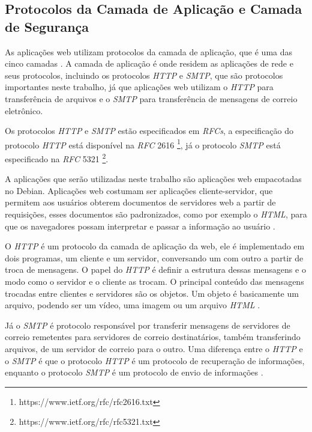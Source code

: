 \subsection{Protocolos da Camada de Aplicação e Camada de Segurança}

As aplicações web utilizam protocolos da camada de aplicação, que é uma das
cinco camadas \cite{kurose2010redes}. A camada de aplicação é onde residem as 
aplicações de rede e seus protocolos, incluindo os protocolos \textit{HTTP} e 
\textit{SMTP}, que são protocolos importantes neste trabalho, já que 
aplicações web utilizam o \textit{HTTP} para transferência de arquivos e o \textit{SMTP} para
transferência de mensagens de correio eletrônico. 

Os protocolos \textit{HTTP} e \textit{SMTP} estão especificados em \textit{RFCs}, a 
especificação do protocolo \textit{HTTP} está disponível na \textit{RFC} 2616 
\footnote{https://www.ietf.org/rfc/rfc2616.txt}, já o protocolo \textit{SMTP} 
está especificado na \textit{RFC} 5321 \footnote{https://www.ietf.org/rfc/rfc5321.txt}.

A aplicações que serão utilizadas neste trabalho são aplicações web empacotadas no
Debian. Aplicações web costumam ser aplicações cliente-servidor, que permitem aos
usuários obterem documentos de servidores web a partir de requisições, 
esses documentos são padronizados, como por exemplo o \textit{HTML}, 
para que os navegadores possam interpretar e passar a informação ao usuário 
\cite{kurose2010redes}.

O \textit{HTTP} é um protocolo da camada de aplicação da web, ele é 
implementado em dois programas, um cliente e um servidor, conversando um 
com outro a partir de troca de mensagens. O papel do \textit{HTTP} é definir a 
estrutura dessas mensagens e o modo como o servidor e o cliente as trocam. O 
principal conteúdo das mensagens trocadas entre clientes e servidores são os 
objetos. Um objeto é basicamente um arquivo, podendo ser um vídeo, uma imagem 
ou um arquivo \textit{HTML} \cite{kurose2010redes}.

Já o \textit{SMTP} é protocolo responsável por transferir mensagens de servidores de correio
remetentes para servidores de correio destinatários, também transferindo arquivos,
de um servidor de correio para o outro. Uma diferença entre o \textit{HTTP} e o \textit{SMTP}
é que o protocolo \textit{HTTP} é um protocolo de recuperação de informações, enquanto
o protocolo \textit{SMTP} é um protocolo de envio de informações \cite{kurose2010redes}. 

